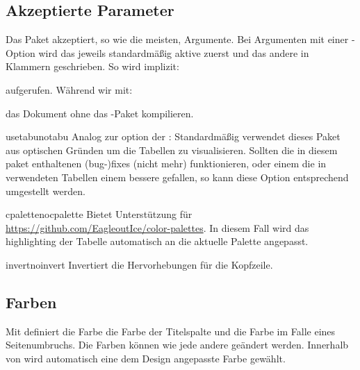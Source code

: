 \documentclass{sopra-base}
\begin{document}
\subsection{Akzeptierte Parameter}
    Das Paket akzeptiert, so wie die meisten, Argumente.
    Bei Argumenten mit einer -Option wird das jeweils standardmäßig aktive zuerst und das andere in Klammern
    geschrieben. So wird implizit:
\begin{plainlatex}
    \usepackage[usetabu]{sopra-tables}
\end{plainlatex}
    aufgerufen. Während wir mit:
\begin{plainlatex}
    \usepackage[notabu]{sopra-tables}
\end{plainlatex}
    das Dokument ohne das -Paket kompilieren.

    \begin{argument}{usetabu}{notabu}
        Analog zur  option der : Standardmäßig verwendet dieses Paket aus optischen Gründen  um die Tabellen zu visualisieren. Sollten die in diesem paket enthaltenen (bug-)fixes (nicht mehr) funktionieren, oder einem die in  verwendeten  Tabellen einem bessere gefallen, so kann diese Option entsprechend umgestellt werden.  
    \end{argument}

    \begin{argument}{cpalette}{nocpalette}
        Bietet Unterstützung für \href{color-palettes}{https://github.com/EagleoutIce/color-palettes}. In diesem Fall wird das highlighting der Tabelle automatisch an die aktuelle Palette angepasst.
    \end{argument}

    \begin{argument}{invert}{noinvert}
        Invertiert die Hervorhebungen für die Kopfzeile.
    \end{argument}

    \subsection{Farben}

    Mit  definiert die Farbe  die Farbe der Titelspalte und  die Farbe im Falle eines Seitenumbruchs. Die Farben können wie jede andere geändert werden. Innerhalb von  wird automatisch eine dem Design angepasste Farbe gewählt.
\end{document}
